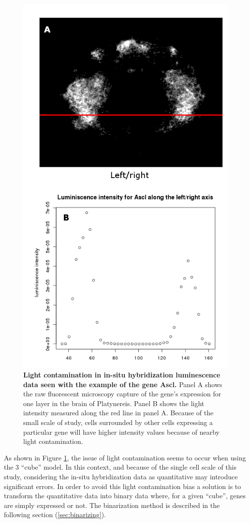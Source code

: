    \begin{figure}[H]
\centerline{\includegraphics[width=0.8\linewidth]{gfx/chapter2/whybina.png}}
\caption{{\bf Light contamination in in-situ hybridization luminescence data seen with the example of the gene Ascl.} Panel A shows the raw fluorescent microscopy capture of the gene's expression for one layer in the brain of Platynereis. Panel B shows the light intensity measured along the red line in panel A. Because of the small scale of study, cells surrounded by other cells expressing a particular gene will have higher intensity values because of nearby light contamination.}\label{fig:why_binarize}
	\end{figure}
  
  As shown in Figure \ref{fig:why_binarize}, the issue of light contamination seems to occur when using the 3  ``cube'' model. In this context, and because of the single cell scale of this study, considering the in-situ hybridization data as quantitative may introduce significant errors. In order to avoid this light contamination bias a solution is to transform the quantitative data into binary data where, for a given ``cube'', genes are simply expressed or not. The binarization method is described in the following section (\ref{sec:binarizing}).
  


